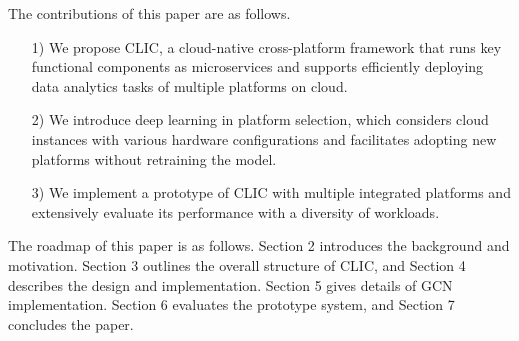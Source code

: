 The contributions of this paper are as follows.
\begin{itemize}
\item [1)]
We propose CLIC, a cloud-native cross-platform framework that runs key functional components as microservices and supports efficiently deploying data analytics tasks of multiple platforms on cloud.
\item [2)]
We introduce deep learning in platform selection, which considers cloud instances with various hardware configurations and facilitates adopting new platforms without retraining the model.
\item [3)]
We implement a prototype of CLIC with multiple integrated platforms and extensively evaluate its performance with a diversity of workloads.

\end{itemize}

The roadmap of this paper is as follows. 
Section 2 introduces the background and motivation. 
Section 3 outlines the overall structure of CLIC, and Section 4 describes the design and implementation. 
Section 5 gives details of GCN implementation. 
Section 6 evaluates the prototype system, and Section 7 concludes the paper.

